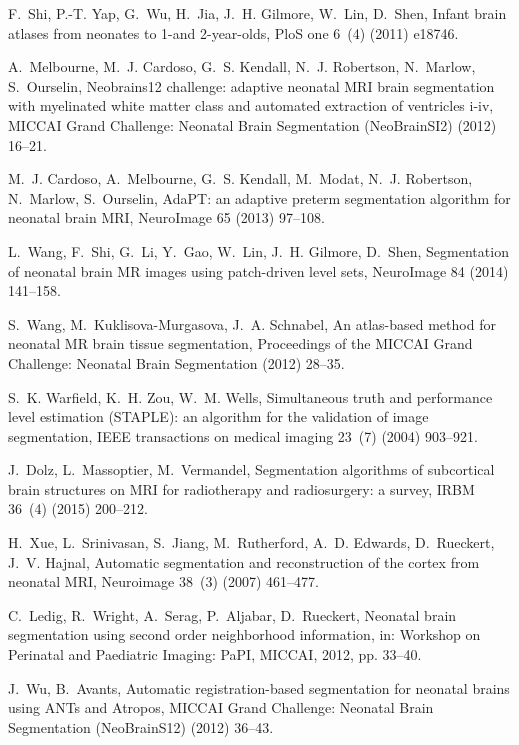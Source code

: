 \documentclass[twoside,espcrc2]{elsarticle}
\begin{document}
\begin{thebibliography}{10}
F.~Shi, P.-T. Yap, G.~Wu, H.~Jia, J.~H. Gilmore, W.~Lin, D.~Shen, Infant brain
  atlases from neonates to 1-and 2-year-olds, PloS one 6~(4) (2011) e18746.

A.~Melbourne, M.~J. Cardoso, G.~S. Kendall, N.~J. Robertson, N.~Marlow,
  S.~Ourselin, Neobrains12 challenge: adaptive neonatal {MRI} brain
  segmentation with myelinated white matter class and automated extraction of
  ventricles i-iv, MICCAI Grand Challenge: Neonatal Brain Segmentation
  (NeoBrainSI2) (2012) 16--21.

M.~J. Cardoso, A.~Melbourne, G.~S. Kendall, M.~Modat, N.~J. Robertson,
  N.~Marlow, S.~Ourselin, {AdaPT}: an adaptive preterm segmentation algorithm
  for neonatal brain {MRI}, NeuroImage 65 (2013) 97--108.

L.~Wang, F.~Shi, G.~Li, Y.~Gao, W.~Lin, J.~H. Gilmore, D.~Shen, Segmentation of
  neonatal brain {MR} images using patch-driven level sets, NeuroImage 84
  (2014) 141--158.

S.~Wang, M.~Kuklisova-Murgasova, J.~A. Schnabel, An atlas-based method for
  neonatal {MR} brain tissue segmentation, Proceedings of the MICCAI Grand
  Challenge: Neonatal Brain Segmentation (2012) 28--35.

S.~K. Warfield, K.~H. Zou, W.~M. Wells, Simultaneous truth and performance
  level estimation ({STAPLE}): an algorithm for the validation of image
  segmentation, IEEE transactions on medical imaging 23~(7) (2004) 903--921.

J.~Dolz, L.~Massoptier, M.~Vermandel, Segmentation algorithms of subcortical
  brain structures on {MRI} for radiotherapy and radiosurgery: a survey, IRBM
  36~(4) (2015) 200--212.

H.~Xue, L.~Srinivasan, S.~Jiang, M.~Rutherford, A.~D. Edwards, D.~Rueckert,
  J.~V. Hajnal, Automatic segmentation and reconstruction of the cortex from
  neonatal {MRI}, Neuroimage 38~(3) (2007) 461--477.

C.~Ledig, R.~Wright, A.~Serag, P.~Aljabar, D.~Rueckert, Neonatal brain
  segmentation using second order neighborhood information, in: Workshop on
  Perinatal and Paediatric Imaging: PaPI, MICCAI, 2012, pp. 33--40.

J.~Wu, B.~Avants, Automatic registration-based segmentation for neonatal brains
  using {ANT}s and {A}tropos, MICCAI Grand Challenge: Neonatal Brain
  Segmentation (NeoBrainS12) (2012) 36--43.


\end{thebibliography}
\end{document}
